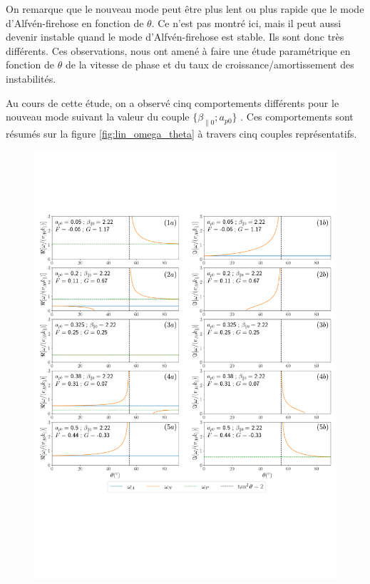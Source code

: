 On remarque que le nouveau mode peut être plus lent ou plus rapide que le mode d'Alfvén-firehose en fonction de $\theta$. Ce n'est pas montré ici, mais il peut aussi devenir instable quand le mode d'Alfvén-firehose est stable. Ils sont donc très différents. Ces observations, nous ont amené à faire une étude paramétrique en fonction de $\theta$ de la vitesse de phase et du taux de croissance/amortissement des instabilités. 

Au cours de cette étude, on a observé cinq comportements différents pour le nouveau mode suivant la valeur du couple  $\{\beta_{\parallel 0};a_{p0}\}$ . Ces comportements sont résumés sur la figure \ref{fig:lin_omega_theta} à travers cinq couples représentatifs. 
\begin{figure}[!ht]
 \centering
\includegraphics[width=\linewidth,trim=0.5cm 6cm 0cm 3cm, clip=true]{./Part_2/images/lin_omega_theta}

\end{figure}
